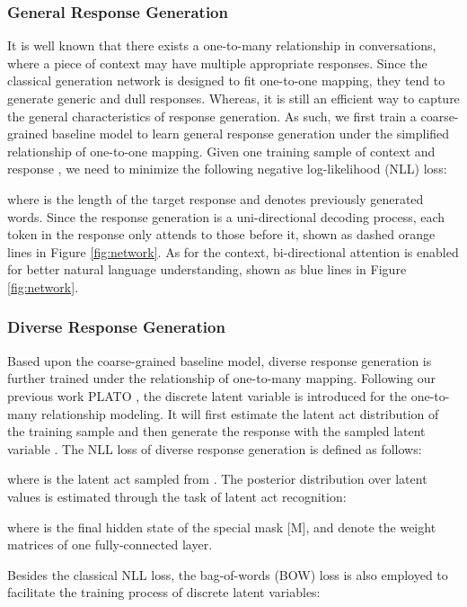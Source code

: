 \documentclass[11pt,a4paper]{article}
\begin{document}
	\subsubsection{General Response Generation}
	It is well known that there exists a one-to-many relationship in conversations, where a piece of context may have multiple appropriate responses. Since the classical generation network is designed to fit one-to-one mapping, they tend to generate generic and dull responses. Whereas, it is still an efficient way to capture the general characteristics of response generation. As such, we first train a coarse-grained baseline model to learn general response generation under the simplified relationship of one-to-one mapping. Given one training sample of context and response , we need to minimize the following negative log-likelihood (NLL) loss:
	
	where  is the length of the target response  and  denotes previously generated words. Since the response generation is a uni-directional decoding process, each token in the response only attends to those before it, shown as dashed orange lines in Figure \ref{fig:network}. As for the context, bi-directional attention is enabled for better natural language understanding, shown as blue lines in Figure \ref{fig:network}.
	
	\subsubsection{Diverse Response Generation}
	Based upon the coarse-grained baseline model, diverse response generation is further trained under the relationship of one-to-many mapping. Following our previous work PLATO \cite{bao2019plato}, the discrete latent variable is introduced for the one-to-many relationship modeling. It will first estimate the latent act distribution of the training sample  and then generate the response with the sampled latent variable . The NLL loss of diverse response generation is defined as follows:
	
	where  is the latent act sampled from . The posterior distribution over latent values is estimated through the task of latent act recognition: 
	
	where  is the final hidden state of the special mask [M],  and  denote the weight matrices of one fully-connected layer.
	
	Besides the classical NLL loss, the bag-of-words (BOW) loss \cite{zhao2017learning} is also employed to facilitate the training process of discrete latent variables:
	
\end{document}
